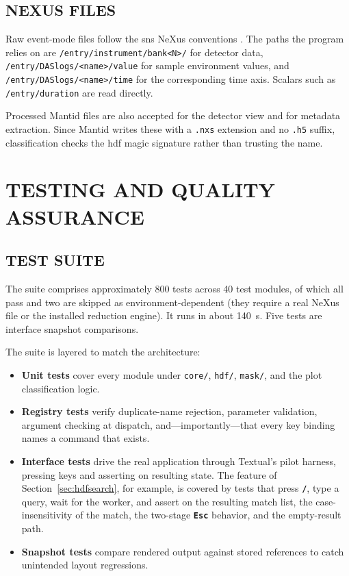 \documentclass[tm]{ornltm}
\newcommand{\key}[1]{\textbf{\texttt{#1}}}
\begin{document}
\subsection{NEXUS FILES}

Raw event-mode files follow the \ac{sns} NeXus conventions
\autocite{nexus}. The paths the program relies on are
\texttt{/entry/instrument/bank<N>/} for detector data,
\texttt{/entry/DASlogs/<name>/value} for sample environment values, and
\texttt{/entry/DASlogs/<name>/time} for the corresponding time axis. Scalars such
as \texttt{/entry/duration} are read directly.

Processed Mantid files are also accepted for the detector view and for metadata
extraction. Since Mantid writes these with a \texttt{.nxs} extension and no
\texttt{.h5} suffix, classification checks the \ac{hdf} magic signature rather
than trusting the name.

\section{TESTING AND QUALITY ASSURANCE}
\label{sec:test}

\subsection{TEST SUITE}

The suite comprises approximately 800 tests across 40 test modules, of which
all pass and two are skipped as environment-dependent (they require a real
NeXus file or the installed reduction engine). It runs in about 140~s. Five
tests are interface snapshot comparisons.

The suite is layered to match the architecture:

\begin{itemize}
  \item \textbf{Unit tests} cover every module under \texttt{core/},
    \texttt{hdf/}, \texttt{mask/}, and the plot classification logic.
  \item \textbf{Registry tests} verify duplicate-name rejection, parameter
    validation, argument checking at dispatch, and---importantly---that every key
    binding names a command that exists.
  \item \textbf{Interface tests} drive the real application through Textual's
    pilot harness, pressing keys and asserting on resulting state. The feature of
    Section~\ref{sec:hdfsearch}, for example, is covered by tests that press
    \key{/}, type a query, wait for the worker, and assert on the resulting
    match list, the case-insensitivity of the match, the two-stage \key{Esc}
    behavior, and the empty-result path.
  \item \textbf{Snapshot tests} compare rendered output against stored
    references to catch unintended layout regressions.
\end{itemize}
\end{document}
